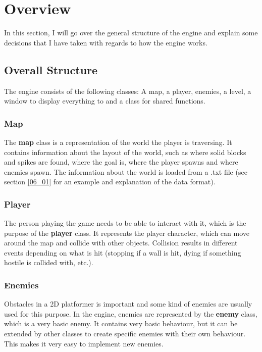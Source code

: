 \section{Overview}
\label{03}

In this section, I will go over the general structure of the engine and explain some decisions that I have taken with regards to how the engine works.

\subsection{Overall Structure}
\label{03_01}

The engine consists of the following classes: A map, a player, enemies, a level, a window to display everything to and a class for shared functions.

\subsubsection{Map}
\label{03_01_01}

The \textbf{map} class is a representation of the world the player is traversing. It contains information about the layout of the world, such as where solid blocks and spikes are found, where the goal is, where the player spawns and where enemies spawn. The information about the world is loaded from a .txt file (see section \ref{06_01} for an example and explanation of the data format).

\subsubsection{Player}
\label{03_01_02}

The person playing the game needs to be able to interact with it, which is the purpose of the \textbf{player} class. It represents the player character, which can move around the map and collide with other objects. Collision results in different events depending on what is hit (stopping if a wall is hit, dying if something hostile is collided with, etc.).

\subsubsection{Enemies}
\label{03_01_03}

Obstacles in a 2D platformer is important and some kind of enemies are usually used for this purpose. In the engine, enemies are represented by the \textbf{enemy} class, which is a very basic enemy. It contains very basic behaviour, but it can be extended by other classes to create specific enemies with their own behaviour. This makes it very easy to implement new enemies.


